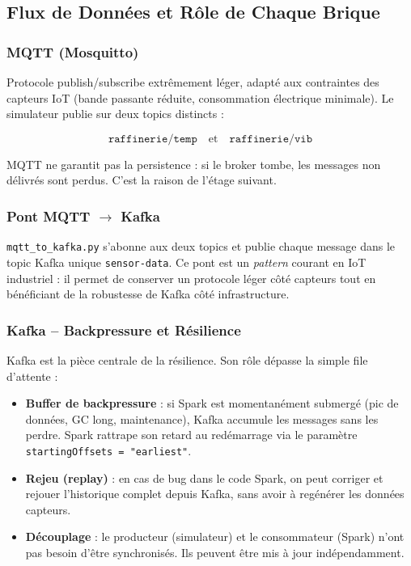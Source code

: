 \documentclass[11pt,a4paper]{article}
\begin{document}
\subsection{Flux de Données et Rôle de Chaque Brique}

\subsubsection{MQTT (Mosquitto)}
Protocole publish/subscribe extrêmement léger, adapté aux contraintes des capteurs IoT (bande passante réduite, consommation électrique minimale). Le simulateur publie sur deux topics distincts :

\[
\texttt{raffinerie/temp} \quad \text{et} \quad \texttt{raffinerie/vib}
\]

MQTT ne garantit pas la persistence : si le broker tombe, les messages non délivrés sont perdus. C'est la raison de l'étage suivant.

\subsubsection{Pont MQTT $\rightarrow$ Kafka}
\texttt{mqtt\_to\_kafka.py} s'abonne aux deux topics et publie chaque message dans le topic Kafka unique \texttt{sensor-data}. Ce pont est un \emph{pattern} courant en IoT industriel : il permet de conserver un protocole léger côté capteurs tout en bénéficiant de la robustesse de Kafka côté infrastructure.

\subsubsection{Kafka -- Backpressure et Résilience}

Kafka est la pièce centrale de la résilience. Son rôle dépasse la simple file d'attente :

\begin{itemize}
    \item \textbf{Buffer de backpressure} : si Spark est momentanément submergé (pic de données, GC long, maintenance), Kafka accumule les messages sans les perdre. Spark rattrape son retard au redémarrage via le paramètre \texttt{startingOffsets = "earliest"}.
    \item \textbf{Rejeu (replay)} : en cas de bug dans le code Spark, on peut corriger et rejouer l'historique complet depuis Kafka, sans avoir à regénérer les données capteurs.
    \item \textbf{Découplage} : le producteur (simulateur) et le consommateur (Spark) n'ont pas besoin d'être synchronisés. Ils peuvent être mis à jour indépendamment.
\end{itemize}
\end{document}
